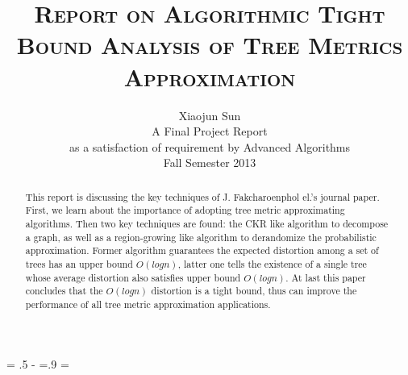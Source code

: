 \documentclass[11pt,twoside, onecolumn]{IEEEtran}
\newcommand{\ls}[1]
    {\dimen0=\fontdimen6\the\font
     \lineskip=#1\dimen0
     \advance\lineskip.5\fontdimen5\the\font
     \advance\lineskip-\dimen0
     \lineskiplimit=.9\lineskip
     \baselineskip=\lineskip
     \advance\baselineskip\dimen0
     \normallineskip\lineskip
     \normallineskiplimit\lineskiplimit
     \normalbaselineskip\baselineskip
     \ignorespaces
    }
\begin{document}

\ls{1.1}

\title{\large{\textsc{Report  on Algorithmic Tight Bound Analysis of
      Tree Metrics Approximation}}}
\author{Xiaojun Sun\\
A Final Project Report\\
as a satisfaction of requirement by Advanced Algorithms\\
Fall Semester 2013
}

%
 
\maketitle

\newcommand{\Fq}{{\mathbb{F}}_{q}}
\newcommand{\Fkk}{{\mathbb{F}}_{2^k}}
\newcommand{\Fkkx}[1][x]{\ensuremath{\mathbb{F}}_{2^k}[#1]\xspace}
\newcommand{\Grobner}{Gr\"{o}bner\xspace}
\newcommand{\B}{{\mathbb{B}}}
\newcommand{\Z}{{\mathbb{Z}}}
\newcommand{\F}{{\mathcal{F}}}
\newcommand{\G}{{\mathcal{G}}}
\newcommand{\R}{\mathbb{R}}

\newcommand{\debug}[1]{\textcolor{gray}{[ #1 ]}}



\begin{abstract}
This report is discussing the key techniques of J. Fakcharoenphol el.'s journal paper\cite{thispaper}.
First, we learn about the importance of adopting tree metric approximating algorithms. Then two key
techniques are found: the CKR like algorithm to decompose a graph, as well as a region-growing like
algorithm to derandomize the probabilistic approximation. Former algorithm guarantees the expected
distortion among a set of trees has an upper bound $O(logn)$, latter one tells the existence of a single
tree whose average distortion also satisfies upper bound $O(logn)$. At last this paper concludes that
the $O(logn)$ distortion is a tight bound, thus can improve the performance of all tree metric approximation
applications. 
\end{abstract}
\end{document}
